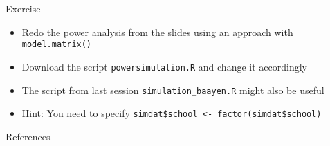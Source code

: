 \documentclass{beamer}
\begin{document}
\begin{frame}[fragile]{}
  \begin{block}{Exercise}
    \begin{itemize} 
      \item Redo the power analysis from the slides using an approach with
        \texttt{model.matrix()}
      \item Download the script \texttt{powersimulation.R} and change it
        accordingly
      \item The script from last session \texttt{simulation\_baayen.R}
        might also be useful
      \item Hint: You need to specify 
        \verb+simdat$school <- factor(simdat$school)+
    \end{itemize}
  \end{block}
\end{frame}

\appendix
\begin{frame}{References}


\vfill
\end{frame}
\end{document}
